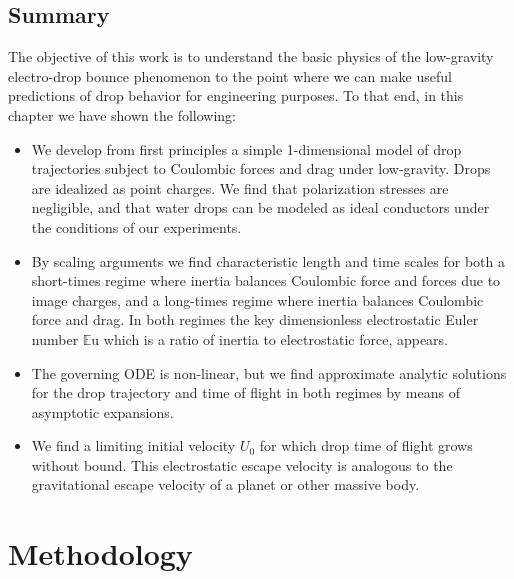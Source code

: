 \documentclass[12pt,a4paper,oneside]{book}
\begin{document}
\section{Summary}
The objective of this work is to understand the basic physics of the low-gravity electro-drop bounce phenomenon to the point where we can make useful predictions of drop behavior for engineering purposes. To that end, in this chapter we have shown the following:
\begin{itemize}
\item We develop from first principles a simple 1-dimensional model of drop trajectories subject to Coulombic forces and drag under low-gravity. Drops are idealized as point charges. We find that polarization stresses are negligible, and that water drops can be modeled as ideal conductors under the conditions of our experiments.
\item By scaling arguments we find characteristic length and time scales for both a short-times regime where inertia balances Coulombic force and forces due to image charges, and a long-times regime where inertia balances Coulombic force and drag. In both regimes the key dimensionless electrostatic Euler number $\mathbb{E}\mbox{u}$ which is a ratio of inertia to electrostatic force, appears. 
\item The governing ODE is non-linear, but we find approximate analytic solutions for the drop trajectory and time of flight in both regimes by means of asymptotic expansions.
\item We find a limiting initial velocity $U_0$ for which drop time of flight grows without bound. This electrostatic escape velocity is analogous to the gravitational escape velocity of a planet or other massive body. 
\end{itemize} 

\chapter{Methodology}
\end{document}
